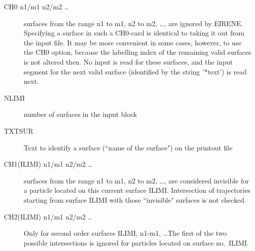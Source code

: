 \begin{description}
  \item[CH0 n1/m1 n2/m2 \dots] 

        surfaces from the range n1 to m1, n2 to m2, \dots, are ignored by EIRENE.
        Specifying a surface in such a CH0-card is identical to taking it out from the
        input file.
        It may be more convenient in some cases, however, to use the CH0 option,
        because the labelling index of the remaining valid surfaces is not altered
        then.
        No input is read for these surfaces, and the input segment for the next valid
        surface (identified by the string '*text') is read next.
  \item[NLIMI] number of surfaces in the input block
  \item[TXTSUR] Text to
        identify a surface (``name of the surface") on the printout file
  \item[CH1(ILIMI) n1/m1 n2/m2 \dots] 

        surfaces from the range n1 to m1, n2 to m2, \dots, are considered invisible for
        a particle located on this current surface ILIMI.
        Intersection of trajectories starting from surface ILIMI with those
        ``invisible" surfaces is not checked.
  \item[CH2(ILIMI) n1/m1 n2/m2 \dots] 

        Only for second order surfaces ILIMI, n1-m1, \dots The first of the two
        possible intersections is ignored for particles located on surface no.\ ILIMI.
\end{description}

